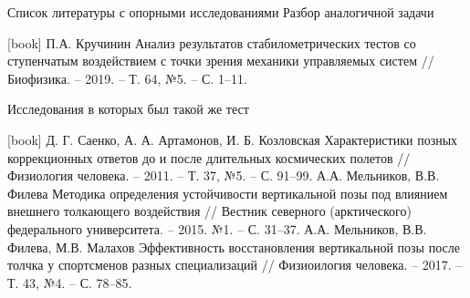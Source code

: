 \documentclass[10pt]{beamer}
\begin{document}
\begin{frame}[shrink=8]{Список литературы с опорными исследованиями}
	Разбор аналогичной задачи
	\begin{thebibliography}{15}
		П.А. Кручинин Анализ результатов стабилометрических тестов со ступенчатым воздействием с точки зрения механики управляемых систем
		// Биофизика. – 2019. – Т. 64, №5. – С. 1–11.
	\end{thebibliography}

	Исследования в которых был такой же тест
	\begin{thebibliography}{15}
		Д. Г. Саенко, А. А. Артамонов, И. Б. Козловская Характеристики позных коррекционных ответов
		до и после длительных космических полетов // Физиология человека. – 2011. – Т. 37, №5. – С. 91–99.
		А.А. Мельников, В.В. Филева Методика определения устойчивости вертикальной позы под влиянием
		внешнего толкающего воздействия // Вестник северного (арктического) федерального университета. – 2015. №1. – С. 31–37.
		А.А. Мельников, В.В. Филева, М.В. Малахов Эффективность восстановления вертикальной позы
		после толчка у спортсменов разных специализаций // Физиоилогия человека. – 2017. – Т. 43, №4. – С. 78–85.

	\end{thebibliography}

\end{frame}
\end{document}
